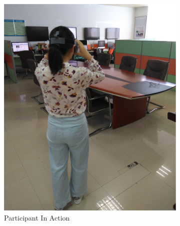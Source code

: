 \documentclass[review]{vgtc}                 %
\begin{document}
\begin{figure}[!htpb]
	\centering
	\begin{subfigure}{0.44\linewidth}
		\centering
		\includegraphics[width=\linewidth]{./figs/lab_real.jpg}
		\caption[]{\label{fig:lab_real} Participant In Action
		}
	\end{subfigure}
	~
	\begin{subfigure}{0.44\linewidth}
		\centering	

\end{subfigure}
\end{figure}
\end{document}
